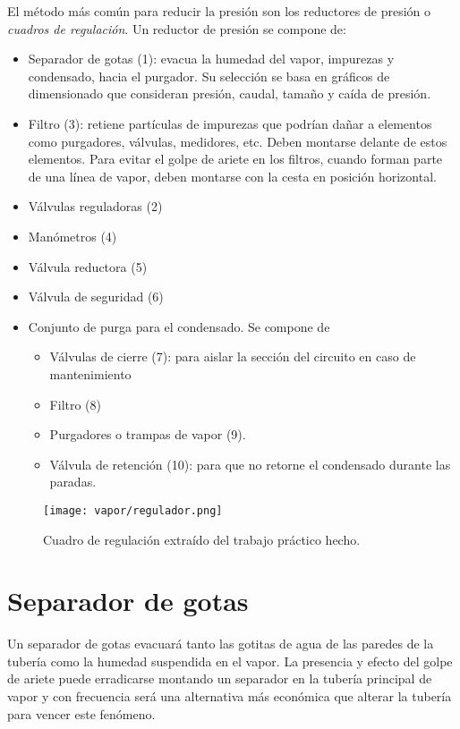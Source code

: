 El método más común para reducir la presión son los reductores de presión o \emph{cuadros de regulación}. Un reductor de presión se compone de:
\begin{itemize}
    \item Separador de gotas (1): evacua la humedad del vapor, impurezas y condensado, hacia el purgador. Su selección se basa en gráficos de dimensionado que consideran presión, caudal, tamaño y caída de presión.
    \item Filtro (3): retiene partículas de impurezas que podrían dañar a elementos como purgadores, válvulas, medidores, etc. Deben montarse delante de estos elementos. Para evitar el golpe de ariete en los filtros, cuando forman parte de una línea de vapor, deben montarse con la cesta en posición horizontal.
    \item Válvulas reguladoras (2)
    \item Manómetros (4)
    \item Válvula reductora (5)
    \item Válvula de seguridad (6)
    \item Conjunto de purga para el condensado. Se compone de \begin{itemize}
        \item Válvulas de cierre (7): para aislar la sección del circuito en caso de mantenimiento
        \item Filtro (8)
        \item Purgadores o trampas de vapor (9).
        \item Válvula de retención (10): para que no retorne el condensado durante las paradas.
    \end{itemize}
    
\end{itemize}

\begin{figure}[H]
    \centering
    \caption{Cuadro de regulación extraído del trabajo práctico hecho.}
    \texttt{[image: vapor/regulador.png]}
\end{figure}

\section{Separador de gotas}

        Un separador de gotas evacuará tanto las gotitas de agua de las paredes de la tubería como la humedad suspendida en el vapor. La presencia y efecto del golpe de ariete puede erradicarse montando un separador en la tubería principal de vapor y con frecuencia será una alternativa más económica que alterar la tubería para vencer este fenómeno.

